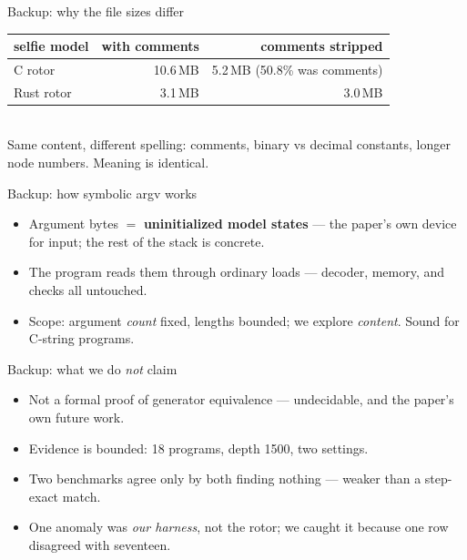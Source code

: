 \documentclass[aspectratio=169]{beamer}
\newcommand{\lab}[1]{{\footnotesize\color{ink!65}#1}}
\begin{document}
\begin{frame}{Backup: why the file sizes differ}
  \centering\footnotesize
  \begin{tabular}{lrr}
    \toprule
    selfie model & with comments & comments stripped\\
    \midrule
    C rotor    & 10.6\,MB & 5.2\,MB \;(50.8\% was comments)\\
    Rust rotor & 3.1\,MB  & 3.0\,MB\\
    \bottomrule
  \end{tabular}\\[0.6em]
  \lab{Same content, different spelling: comments, binary vs decimal
       constants, longer node numbers. Meaning is identical.}
\end{frame}

\begin{frame}{Backup: how symbolic argv works}
  \begin{itemize}\setlength\itemsep{0.45em}
    \item Argument bytes $=$ \textbf{uninitialized model states} --- the
          paper's own device for input; the rest of the stack is concrete.
    \item The program reads them through ordinary loads --- decoder, memory,
          and checks all untouched.
    \item Scope: argument \emph{count} fixed, lengths bounded; we explore
          \emph{content}. Sound for C-string programs.
  \end{itemize}
\end{frame}

\begin{frame}{Backup: what we do \emph{not} claim}
  \begin{itemize}\setlength\itemsep{0.45em}
    \item Not a formal proof of generator equivalence --- undecidable, and the
          paper's own future work.
    \item Evidence is bounded: 18 programs, depth 1500, two settings.
    \item Two benchmarks agree only by both finding nothing --- weaker than a
          step-exact match.
    \item One anomaly was \emph{our harness}, not the rotor; we caught it
          because one row disagreed with seventeen.
  \end{itemize}
\end{frame}
\end{document}
